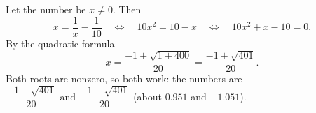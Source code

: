 Let the number be $x\ne0$. Then
\[
x=\dfrac{1}{x}-\dfrac{1}{10}\quad\Longleftrightarrow\quad10x^2=10-x\quad\Longleftrightarrow\quad10x^2+x-10=0 .
\]
By the quadratic formula
\[
x=\dfrac{-1\pm\sqrt{1+400}}{20}=\dfrac{-1\pm\sqrt{401}}{20}.
\]
Both roots are nonzero, so both work: the numbers are $\boxed{\dfrac{-1+\sqrt{401}}{20}\text{ and }\dfrac{-1-\sqrt{401}}{20}}$ (about $0.951$ and $-1.051$).
